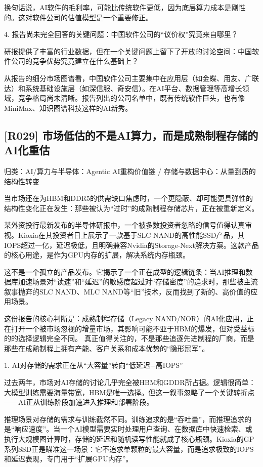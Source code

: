 \documentclass[11pt]{ctexart}
\begin{document}
换句话说，AI软件的毛利率，可能比传统软件更低，因为底层算力成本是刚性的。这对软件公司的估值模型是一个重要修正。

4. 报告尚未完全回答的关键问题：中国软件公司的“议价权”究竟来自哪里？

研报提供了丰富的行业数据，但在一个关键问题上留下了开放的讨论空间：中国软件公司的竞争优势究竟建立在什么基础上？

从报告的细分市场图谱看，中国软件公司主要集中在应用层（如金蝶、用友、广联达）和系统基础设施层（如深信服、奇安信）。在AI平台、数据管理等高增长领域，竞争格局尚未清晰。报告列出的公司名单中，既有传统软件巨头，也有像MiniMax、知识图谱科技这样的AI新秀。

\subsection{[R029] 市场低估的不是AI算力，而是成熟制程存储的AI化重估}
{\small\color{refgray}归类：AI/算力与半导体：Agentic AI重构价值链 / 存储与数据中心：从量到质的结构性转变}

当市场还在为HBM和DDR5的供需缺口焦虑时，一个更隐蔽、却可能更具弹性的结构性变化正在发生：那些被认为“过时”的成熟制程存储芯片，正在被重新定义。

某外资投行最新发布的半导体研报中，一个被多数投资者忽略的信号值得认真审视。Kioxia在其投资者日上展示了一款基于SLC NAND的高性能SSD产品，其IOPS超过一亿，延迟极低，且明确兼容Nvidia的Storage-Next解决方案。这款产品的核心用途，是作为GPU内存的扩展，解决系统内存瓶颈。

这不是一个孤立的产品发布。它揭示了一个正在成型的逻辑链条：当AI推理和数据库加速场景对“读速”和“延迟”的敏感度超过对“存储密度”的追求时，那些被主流叙事抛弃的SLC NAND、MLC NAND等“旧”技术，反而找到了新的、高价值的应用场景。

这份报告的核心判断是：成熟制程存储（Legacy NAND/NOR）的AI化应用，正在打开一个被市场忽视的增量市场，其影响可能不亚于HBM的爆发，但对受益标的的选择逻辑完全不同。 真正值得关注的，不是那些追逐先进制程的厂商，而是那些在成熟制程上拥有产能、客户关系和成本优势的“隐形冠军”。

1. AI对存储的需求正在从“大容量”转向“低延迟+高IOPS”

过去两年，市场对AI存储的讨论几乎完全被HBM和GDDR所占据。逻辑很简单：大模型训练需要海量带宽，HBM是唯一选择。但这一叙事忽略了一个关键转折点——AI正从训练阶段加速进入推理和部署阶段。

推理场景对存储的需求与训练截然不同。训练追求的是“吞吐量”，而推理追求的是“响应速度”。当一个AI模型需要实时处理用户查询、在数据库中快速检索、或执行大规模图计算时，存储的延迟和随机读写性能就成了核心瓶颈。Kioxia的GP系列SSD正是瞄准这一场景：它不追求单颗粒的最大容量，而是追求极致的IOPS和延迟表现，专门用于“扩展GPU内存”。
\end{document}
